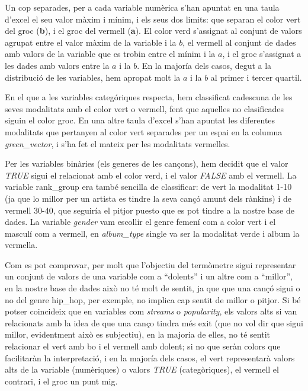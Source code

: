 \documentclass{article}
\begin{document}
Un cop separades, per a cada variable numèrica s'han apuntat en una taula d'excel el seu valor màxim i mínim, i els seus dos limits: que separan el color vert del groc (\textbf{b}), i el groc del vermell (\textbf{a}). El color verd s'assignat al conjunt de valors agrupat entre el valor màxim de la variable i la $b$, el vermell al conjunt de dades amb valors de la variable que es trobin entre el mínim i la $a$, i el groc s'assignat a les dades amb valors entre la $a$ i la $b$. En la majoría dels casos, degut a la distribució de les variables, hem apropat molt la $a$ i la $b$ al primer i tercer quartil. 


En el que a les variables categóriques respecta, hem classificat cadescuna de les seves modalitats amb el color vert o vermell, fent que aquelles no clasificades siguin el color groc. En una altre taula d'excel s'han apuntat les diferentes modalitats que pertanyen al color vert separades per un espai en la columna \textit{green\_vector}, i s'ha fet el mateix per les modalitats vermelles.

Per les variables binàries (els generes de les cançons), hem decidit que el valor \textit{TRUE} sigui el relacionat amb el color verd, i el valor \textit{FALSE} amb el vermell. La variable rank\_group era també sencilla de classificar: de vert la modalitat 1-10 (ja que lo millor per un artista es tindre la seva cançó amunt dels rànkins) i de vermell 30-40, que seguiría el pitjor puesto que es pot tindre a la nostre base de dades. La variable \textit{gender} vam escollir el genre femení com a color vert i el masculí com a vermell, en \textit{album\_type} single va ser la modalitat verde i album la vermella.

Com es pot comprovar, per molt que l'objectiu del termòmetre sigui representar un conjunt de valors de una variable com a ``dolents'' i  un altre com a ``millor'', en la nostre base de dades això no té molt de sentit, ja que que una cançó sigui o no del genre hip\_hop, per exemple, no implica cap sentit de millor o pitjor. Si bé potser coincideix que en variables com \textit{streams} o \textit{popularity}, els valors alts si van relacionats amb la idea de que una canço tindra més exit (que no vol dir que sigui millor, evidentment això es subjectiu), en la majoria de elles, no té sentit relacionar el vert amb bo i el vermell amb dolent; si no que seràn colors que facilitaràn la interpretació, i en la majoría dels casos, el vert representarà valors alts de la variable (numèriques) o valors \textit{TRUE} (categòriques), el vermell el contrari, i el groc un punt mig. 
\end{document}
